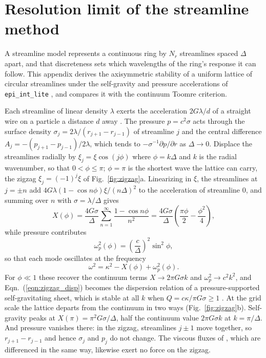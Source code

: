\documentclass[twocolumn]{aastex702}
\newcommand{\code}[1]{\texttt{#1}}   %
\begin{document}
\section{Resolution limit of the streamline method}
\label{sec:appendix_zigzag}
\setcounter{equation}{0}

A streamline model represents a continuous ring by $N_r$ streamlines spaced $\Delta$ apart, and
that discreteness sets which wavelengths of the ring's response it can follow. This appendix
derives the axisymmetric stability of a uniform lattice of circular streamlines under the
self-gravity and pressure accelerations of \code{epi\_int\_lite} \citep{HS13, H25}, and compares it
with the continuum Toomre criterion.

Each streamline of linear density $\lambda$ exerts the acceleration $2G\lambda/d$ of a straight
wire on a particle a distance $d$ away \citep{HS13}. The pressure $p = c^2\sigma$ acts through
the surface density $\sigma_j = 2\lambda/(r_{j+1} - r_{j-1})$ of streamline $j$ and the central
difference $A_j = -(p_{j+1} - p_{j-1})/2\lambda$, which tends to $-\sigma^{-1}\partial p/\partial r$
as $\Delta \rightarrow 0$. Displace the streamlines radially by $\xi_j = \xi\cos(j\phi)$ where
$\phi = k\Delta$ and $k$ is the radial wavenumber, so that $0 < \phi \le \pi$; $\phi = \pi$ is
the shortest wave the lattice can carry, the zigzag $\xi_j = (-1)^j\xi$ of
Fig.~\ref{fig:zigzag}a. Linearizing in $\xi$, the streamlines at $j = \pm n$ add
$4G\lambda(1 - \cos n\phi)\xi/(n\Delta)^2$ to the acceleration of streamline 0, and summing over
$n$ with $\sigma = \lambda/\Delta$ gives
\begin{equation}
    \label{eqn:zigzag_X}
    X(\phi) = \frac{4G\sigma}{\Delta}\sum_{n=1}^\infty\frac{1 - \cos n\phi}{n^2}
            = \frac{4G\sigma}{\Delta}\left(\frac{\pi\phi}{2} - \frac{\phi^2}{4}\right),
\end{equation}
while pressure contributes
\begin{equation}
    \label{eqn:zigzag_p}
    \omega_p^2(\phi) = \left(\frac{c}{\Delta}\right)^2\sin^2\phi,
\end{equation}
so that each mode oscillates at the frequency
\begin{equation}
    \label{eqn:zigzag_disp}
    \omega^2 = \kappa^2 - X(\phi) + \omega_p^2(\phi).
\end{equation}
For $\phi \ll 1$ these recover the continuum terms $X \rightarrow 2\pi G\sigma k$ and
$\omega_p^2 \rightarrow c^2k^2$, and Eqn.\ (\ref{eqn:zigzag_disp}) becomes the dispersion relation
of a pressure-supported self-gravitating sheet, which is stable at all $k$ when
$Q = c\kappa/\pi G\sigma \ge 1$ \citep{T64, BT87}. At the grid scale the lattice departs from
the continuum in two ways (Fig.~\ref{fig:zigzag}b). Self-gravity peaks at
$X(\pi) = \pi^2G\sigma/\Delta$, half the continuum value $2\pi G\sigma k$ at $k = \pi/\Delta$.
And pressure vanishes there: in the zigzag, streamlines $j \pm 1$ move together, so
$r_{j+1} - r_{j-1}$ and hence $\sigma_j$ and $p_j$ do not change. The viscous fluxes of
\cite{HS13}, which are differenced in the same way, likewise exert no force on the zigzag.
\end{document}
